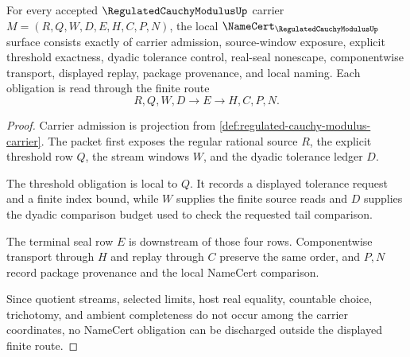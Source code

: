 \begin{theorem}
\label{thm:regulated-cauchy-modulus-namecert-obligations}
For every accepted $\RegulatedCauchyModulusUp$ carrier $M=(R,Q,W,D,E,H,C,P,N)$, the local $\NameCert_{\RegulatedCauchyModulusUp}$ surface consists exactly of carrier admission, source-window exposure, explicit threshold exactness, dyadic tolerance control, real-seal nonescape, componentwise transport, displayed replay, package provenance, and local naming. Each obligation is read through the finite route
$$
R,Q,W,D \longrightarrow E \longrightarrow H,C,P,N .
$$
\end{theorem}
\begin{proof}
Carrier admission is projection from \autoref{def:regulated-cauchy-modulus-carrier}. The packet first exposes the regular rational source $R$, the explicit threshold row $Q$, the stream windows $W$, and the dyadic tolerance ledger $D$.

The threshold obligation is local to $Q$. It records a displayed tolerance request and a finite index bound, while $W$ supplies the finite source reads and $D$ supplies the dyadic comparison budget used to check the requested tail comparison.

The terminal seal row $E$ is downstream of those four rows. Componentwise transport through $H$ and replay through $C$ preserve the same order, and $P,N$ record package provenance and the local NameCert comparison.

Since quotient streams, selected limits, host real equality, countable choice, trichotomy, and ambient completeness do not occur among the carrier coordinates, no NameCert obligation can be discharged outside the displayed finite route.
\end{proof}

